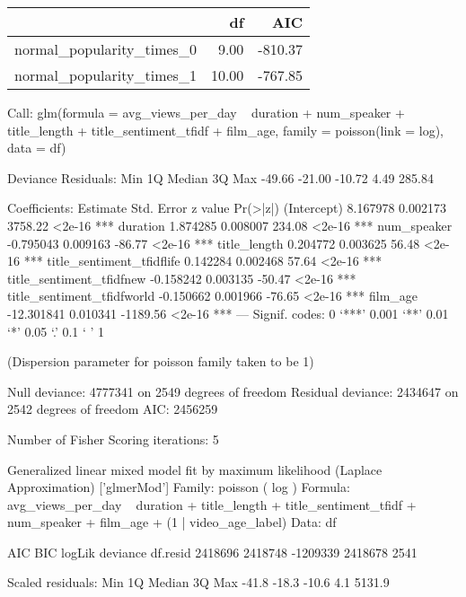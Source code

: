 \begin{table}[ht]
\centering
\begin{tabular}{rrr}
  \hline
 & df & AIC \\ 
  \hline
normal\_popularity\_times\_0 & 9.00 & -810.37 \\ 
  normal\_popularity\_times\_1 & 10.00 & -767.85 \\ 
   \hline
\end{tabular}
\end{table}

Call:
glm(formula = avg_views_per_day ~ duration + num_speaker + title_length + 
    title_sentiment_tfidf + film_age, family = poisson(link = log), 
    data = df)

Deviance Residuals: 
   Min      1Q  Median      3Q     Max  
-49.66  -21.00  -10.72    4.49  285.84  

Coefficients:
                             Estimate Std. Error  z value Pr(>|z|)    
(Intercept)                  8.167978   0.002173  3758.22   <2e-16 ***
duration                     1.874285   0.008007   234.08   <2e-16 ***
num_speaker                 -0.795043   0.009163   -86.77   <2e-16 ***
title_length                 0.204772   0.003625    56.48   <2e-16 ***
title_sentiment_tfidflife    0.142284   0.002468    57.64   <2e-16 ***
title_sentiment_tfidfnew    -0.158242   0.003135   -50.47   <2e-16 ***
title_sentiment_tfidfworld  -0.150662   0.001966   -76.65   <2e-16 ***
film_age                   -12.301841   0.010341 -1189.56   <2e-16 ***
---
Signif. codes:  0 ‘***’ 0.001 ‘**’ 0.01 ‘*’ 0.05 ‘.’ 0.1 ‘ ’ 1

(Dispersion parameter for poisson family taken to be 1)

    Null deviance: 4777341  on 2549  degrees of freedom
Residual deviance: 2434647  on 2542  degrees of freedom
AIC: 2456259

Number of Fisher Scoring iterations: 5

Generalized linear mixed model fit by maximum likelihood (Laplace Approximation) ['glmerMod']
 Family: poisson  ( log )
Formula: avg_views_per_day ~ duration + title_length + title_sentiment_tfidf +      num_speaker + film_age + (1 | video_age_label)
   Data: df

     AIC      BIC   logLik deviance df.resid 
 2418696  2418748 -1209339  2418678     2541 

Scaled residuals: 
   Min     1Q Median     3Q    Max 
 -41.8  -18.3  -10.6    4.1 5131.9 

